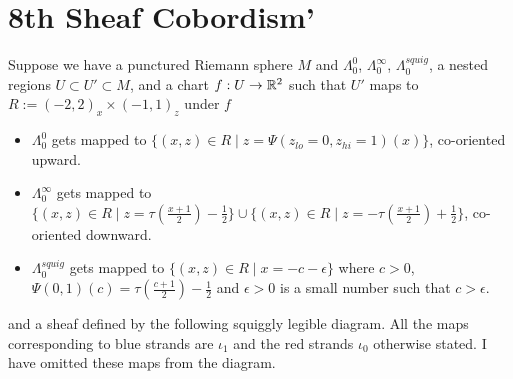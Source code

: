 \section{8th Sheaf Cobordism'}
Suppose we have a punctured Riemann sphere $M$ and $\Lambda_0^0$, $\Lambda_0^\infty$, $\Lambda_0^{squig}$, a nested regions $U\subset U' \subset M$, and a chart $f : U \rightarrow \mathbb{R}^2$ such that $U'$ maps to $R:=(-2,2)_x \times (-1,1)_z$ under $f$
\begin{itemize}
\item $\Lambda_0^0$ gets mapped to $\{(x,z)\in R \mid z=\Psi(z_{lo} = 0,z_{hi}=1)(x)\}$, co-oriented upward.

\item $\Lambda_0^\infty$ gets mapped to $\{(x,z)\in R \mid z=\tau(\frac{x+1}{2})-\frac{1}{2}\}\cup \{(x,z)\in R \mid z=-\tau(\frac{x+1}{2})+\frac{1}{2}\}$, co-oriented downward.

\item $\Lambda_0^{squig}$ gets mapped to $\{(x,z)\in R \mid x = -c-\epsilon\}$ where $c>0$, $\Psi(0,1)(c) = \tau(\frac{c+1}{2})-\frac{1}{2}$ and $\epsilon >0$ is a small number such that $c>\epsilon$.
\end{itemize}
and a sheaf defined by the following squiggly legible diagram. All the maps corresponding to blue strands are $\iota_1$ and the red strands $\iota_0$ otherwise stated. I have omitted these maps from the diagram.\\

